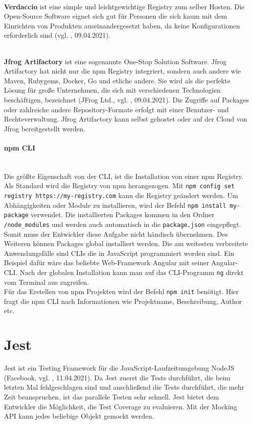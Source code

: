 \mbox{}\\
\textbf{Verdaccio} ist eine simple und leichtgewichtige Registry zum selber Hosten. Die Open-Source Software eignet sich gut für Personen die sich kaum mit dem Einrichten von Produkten auseinandergesetzt haben, da keine Konfigurationen erforderlich sind (vgl. \cite{verdaccio_2021}, 09.04.2021).

\mbox{}\\
\textbf{Jfrog Artifactory} ist eine sogenannte One-Stop Solution Software. Jfrog Artifactory hat nicht nur die npm Registry integriert, sondern auch andere wie Maven, Rubygems, Docker, Go und etliche andere. Sie wird als die perfekte Lösung für große Unternehmen, die sich mit verschiedenen Technologien beschäftigen, bezeichnet (JFrog Ltd., vgl. \cite{jfrog_2021}, 09.04.2021). Die Zugriffe auf Packages oder zahlreiche andere Repository-Formate erfolgt mit einer Benutzer- und Rechteverwaltung. Jfrog Artifactory kann selbst gehostet oder auf der Cloud von Jfrog bereitgestellt werden.

\paragraph{npm CLI}
\mbox{}\\
Die größte Eigenschaft von der CLI, ist die Installation von einer npm Registry. Als Standard wird die Registry von npm herangezogen. Mit \texttt{npm config set registry https://my-registry.com} kann die Registry geändert werden. Um Abhängigkeiten oder Module zu installieren, wird der Befehl \texttt{npm install my-package} verwendet. Die installierten Packages kommen in den Ordner \texttt{/node\_modules} und werden auch automatisch in die \texttt{package.json} eingepflegt. Somit muss der Entwickler diese Aufgabe nicht händisch übernehmen. Des Weiteren können Packages global installiert werden. Die am weitesten verbreitete Anwendungsfälle sind CLIs die in JavaScript programmiert worden sind. Ein Beispiel dafür wäre das beliebte Web-Framework Angular mit seiner Angular-CLI. Nach der globalen Installation kann man auf das CLI-Programm \texttt{ng} direkt vom Terminal aus zugreifen.\\
Für das Erstellen von npm Projekten wird der Befehl \texttt{npm init} benötigt. Hier fragt die npm CLI nach Informationen wie Projektname, Beschreibung, Author etc.

\section{Jest}
Jest ist ein Testing Framework für die JavaScript-Laufzeitumgebung NodeJS (Facebook, vgl. \cite{jest_2021}, 11.04.2021). Da Jest zuerst die Tests durchführt, die beim letzten Mal fehlgeschlagen sind und anschließend die Tests durchführt, die mehr Zeit beanspruchen, ist das parallele Testen sehr schnell. Jest bietet dem Entwickler die Möglichkeit, die Test Coverage zu evaluieren. Mit der Mocking API kann jedes beliebige Objekt gemockt werden.

